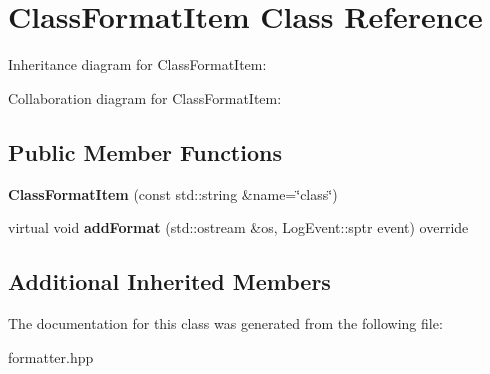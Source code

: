 \hypertarget{classClassFormatItem}{}\section{Class\+Format\+Item Class Reference}
\label{classClassFormatItem}


Inheritance diagram for Class\+Format\+Item\+:


Collaboration diagram for Class\+Format\+Item\+:
\subsection*{Public Member Functions}
\begin{DoxyCompactItemize}
\item 
\mbox{\label{classClassFormatItem_a2a188237720cc1524a772194d07e4232}} 
{\bfseries Class\+Format\+Item} (const std\+::string \&name=\char`\"{}class\char`\"{})
\item 
\mbox{\label{classClassFormatItem_a1f94fa801663d6144cf8921ff3bf0ecd}} 
virtual void {\bfseries add\+Format} (std\+::ostream \&os, Log\+Event\+::sptr event) override
\end{DoxyCompactItemize}
\subsection*{Additional Inherited Members}


The documentation for this class was generated from the following file\+:\begin{DoxyCompactItemize}
\item 
formatter.\+hpp\end{DoxyCompactItemize}
